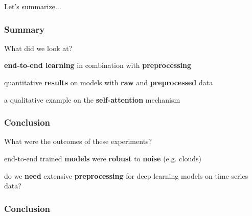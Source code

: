 \documentclass[%
  aspectratio=169,
  9pt,
  USenglish,
  light,
  mathserif,
  professionalfont,
  affiliationintitlepagehead,
  titlegraphic,
   affiliation,
]{beamer}
\begin{document}
{


{
	\begin{frame}[plain]
	
	\vspace{8em}
	\begin{center}
		\Huge\color{white}
		Let's summarize...
	\end{center}\color{white}
	
\end{frame}
}

\begin{frame}
\frametitle{Summary}
\Large 

\begin{leftbubbles}
	What did we look at?
\end{leftbubbles}

\pause
\begin{rightbubbles}
	\textbf{end-to-end learning} in combination with \textbf{preprocessing}
\end{rightbubbles}

\pause
\begin{rightbubbles}
	quantitative \textbf{results} on models with \textbf{raw} and \textbf{preprocessed} data
\end{rightbubbles}

\pause
\begin{rightbubbles}
	a qualitative example on the \textbf{self-attention} mechanism
\end{rightbubbles}

\end{frame}

\begin{frame}
\frametitle{Conclusion}
\Large 

\begin{leftbubbles}
	What were the outcomes of these experiments?
\end{leftbubbles}

\pause
\begin{rightbubbles}
	{end-to-end} trained \textbf{models} were \textbf{robust} to \textbf{noise} {\small (e.g. clouds)}
\end{rightbubbles}

\pause
\begin{rightbubbles}
	do we \textbf{need} extensive \textbf{preprocessing} for deep learning models on time series data?
\end{rightbubbles}

\end{frame}
\frametitle{Conclusion}

}
\end{document}
